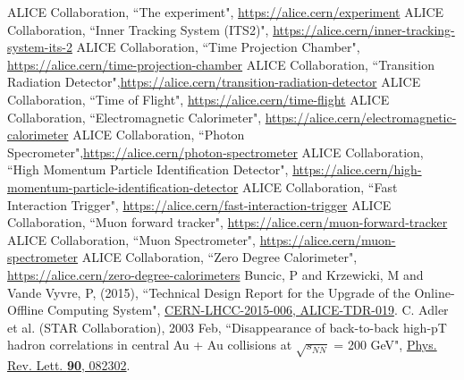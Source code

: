 \begin{thebibliography}{50}
ALICE Collaboration, ``The experiment", \href{https://alice.cern/experiment}{https://alice.cern/experiment}
ALICE Collaboration, ``Inner Tracking System (ITS2)", \href{https://alice.cern/inner-tracking-system-its-2}{https://alice.cern/inner-tracking-system-its-2}
ALICE Collaboration, ``Time Projection Chamber", \href{https://alice.cern/time-projection-chamber}{https://alice.cern/time-projection-chamber}
ALICE Collaboration, ``Transition Radiation Detector",\href{https://alice.cern/transition-radiation-detector}{https://alice.cern/transition-radiation-detector}
ALICE Collaboration, ``Time of Flight", \href{https://alice.cern/time-flight}{https://alice.cern/time-flight}
ALICE Collaboration, ``Electromagnetic Calorimeter", \href{https://alice.cern/electromagnetic-calorimeter}{https://alice.cern/electromagnetic-calorimeter}
ALICE Collaboration, ``Photon Specrometer",\href{https://alice.cern/photon-spectrometer}{https://alice.cern/photon-spectrometer}
ALICE Collaboration, ``High Momentum Particle Identification Detector", \href{https://alice.cern/high-momentum-particle-identification-detector}{https://alice.cern/high-momentum-particle-identification-detector}
ALICE Collaboration, ``Fast Interaction Trigger", \href{https://alice.cern/fast-interaction-trigger}{https://alice.cern/fast-interaction-trigger}
ALICE Collaboration, ``Muon forward tracker", \href{https://alice.cern/muon-forward-tracker}{https://alice.cern/muon-forward-tracker}
ALICE Collaboration, ``Muon Spectrometer", \href{https://alice.cern/muon-spectrometer}{https://alice.cern/muon-spectrometer}
ALICE Collaboration, ``Zero Degree Calorimeter", \href{https://alice.cern/zero-degree-calorimeters}{https://alice.cern/zero-degree-calorimeters}
Buncic, P and Krzewicki, M and Vande Vyvre, P, (2015), ``Technical Design Report for the Upgrade of the Online-Offline Computing System", \href{http://cds.cern.ch/record/2011297}{CERN-LHCC-2015-006, ALICE-TDR-019}.
C. Adler et al. (STAR Collaboration), 2003 Feb, ``Disappearance of back-to-back high-pT hadron correlations in central Au + Au collisions at $\sqrt{s_{NN}}$ = 200 GeV", \href{http://dx.doi.org/10.1103/PhysRevLett.90.082302}{Phys. Rev. Lett. \textbf{90}, 082302}.

\end{thebibliography}
